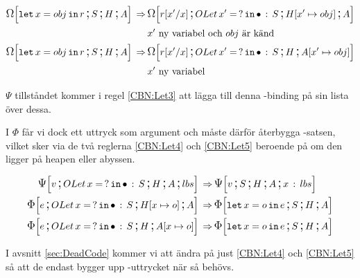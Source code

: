 \documentclass[../Optimise]{subfiles}
\begin{document}
\begin{align}
\label{CBN:Let1} \CBNOMEGA SHA{\eLet x{obj}r} \rulesep & \CBNOMEGA {\cOLet{x'}S}{\heap{x'}{obj}}A{\subst r{x'}x}\\
   & x'\mbox{ ny variabel och } obj \text{ är känd}\nonumber \\
\label{CBN:Let2} \CBNOMEGA SHA{\eLet x{obj}r} \rulesep & \CBNOMEGA{\cOLet{x'}S}H{\abyss{x'}{obj}}{\subst r{x'}x}\\
   & x'\mbox{ ny variabel} \nonumber 
\end{align}

$\Psi$ tillståndet kommer i regel \eqref{CBN:Let3} att lägga till denna -binding
på sin lista över dessa.

 I $\Phi$ får vi dock ett uttryck som argument och måste därför 
återbygga -satsen, vilket sker via de två reglerna \eqref{CBN:Let4} och 
\eqref{CBN:Let5} beroende på om den ligger på heapen eller abyssen.

\begin{align}
\label{CBN:Let3} \CBNPSI{\cOLet xS}H A{lbs}v \rulesep & \CBNPSI SHA{x\,:\, lbs}v \\
\label{CBN:Let4} \CBNIRR{\cOLet xS}{\heap xo}Ae \rulesep & \CBNIRR SHA{\eLet xoe} \\
\label{CBN:Let5} \CBNIRR{\cOLet xS}H{\abyss xo}e \rulesep & \CBNIRR SHA{\eLet xoe}
\end{align}


I avsnitt \ref{sec:DeadCode} kommer vi att ändra på just \eqref{CBN:Let4} 
och \eqref{CBN:Let5} så att de endast bygger upp -uttrycket när så behövs.


\end{document}
